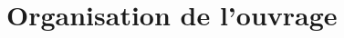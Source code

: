 \clearpage
\widecenteredpagegeometry
\pagestyle{empty}

\chapter*{Organisation de l’ouvrage}
\thispagestyle{empty}

	
	
\restoregeometry
\pagestyle{fancy}
